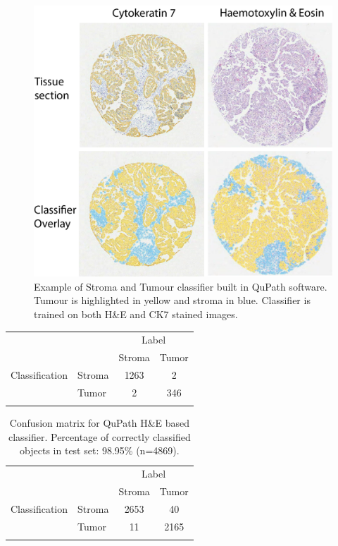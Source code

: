 \begin{figure}
    \centering
    \includegraphics{Figs/heck/A-2_core_class.png}
    \caption[Example of Stroma and Tumour classifier built in QuPath software]{Example of Stroma and Tumour classifier built in QuPath software. Tumour is highlighted in yellow and stroma in blue. Classifier is trained on both H\&E and CK7 stained images.}
    \label{fig:he_classify}
\end{figure}

\begin{table}[]
    \centering
    \begin{tabular}{llcc}
    \hline
    & & \multicolumn{2}{c}{Label}\\
    &   &   Stroma  &   Tumor\\
       \hline
Classification&Stroma   &    1263    &     2\\
&Tumor   &      2     &  346 \\ \hline \\
    \end{tabular}
    \label{tab:classifier_ck}
\end{table}


\begin{table}[]
    \centering
    \begin{tabular}{llcc}
    \hline
       &           &  \multicolumn{2}{c}{Label}\\
       &           &    Stroma	& Tumor\\ 
\hline
Classification & Stroma	&  2653	 &   40\\
             & Tumor	 &   11	 & 2165\\
 \hline \\
    \end{tabular}
    \caption[Confusion matrix for QuPath H\&E based classifier.]{Confusion matrix for QuPath H\&E based classifier. Percentage of correctly classified objects in test set: 98.95\% (n=4869).}
    \label{tab:classifier_he}
\end{table}

